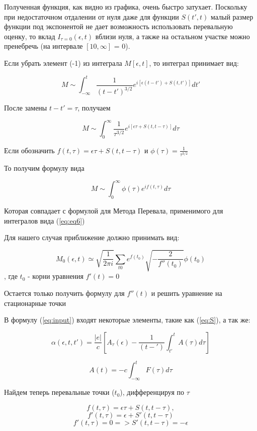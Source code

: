 \documentclass[14pt]{extarticle}
\begin{document}
Полученная функция, как видно из графика, очень быстро затухает. Поскольку при недостаточном отдалении от нуля даже для функции $S(t', t)$ малый размер функции под экспонентой не дает возможность использовать перевальную оценку, то вклад $I_{\tau = 0}(\epsilon, t)$ вблизи нуля, а также на остальном участке можно пренебречь (на интервале $[10, \infty]$ = 0).  

Если убрать элемент (-1) из интеграла $M[\epsilon, t]$, то интеграл принимает вид:

$$
M \sim \int_{-\infty}^{t} \frac{1}{(t-t')^{3/2}} e^{i[\epsilon (t - t') + S(t, t')]} dt'
$$

После замены $t - t' = \tau$, получаем 

$$
M \sim \int_{0}^{\infty}\frac{1}{{\tau}^{3/2}}e^{i [\epsilon \tau + S(t, t-\tau)]} d\tau
$$

Если обозначить
$
f(t, \tau) = \epsilon \tau + S(t, t-\tau) 
$ и
$
\phi(\tau) = \frac{1}{{\tau}^{3/2}} 
$

То получим формулу вида

$$
M \sim \int_{0}^{\infty} \phi(\tau) e^{i f(t, \tau)} d\tau
$$

Которая совпадает с формулой для Метода Перевала, применимого для интегралов вида (\ref{eq:eq6})

Для нашего случая приближение должно принимать вид:

$$
M_0(\epsilon, t) \simeq \sqrt{\frac{1}{2\pi i }}\sum_{t0}e^{f(t_0)} \sqrt{-\frac{2}{f''(t_0)}} \phi(t_0)
$$, где $t_0$ - корни уравнения $f'(t) = 0$

Остается только получить формулу для $f''(t)$ и решить уравнение на стационарные точки 

В формулу (\ref{eq:input}) входят некоторые элементы, такие как (\ref{eq:S}), а так же:

\begin{equation}\label{eq:alpha}
	\alpha(\epsilon, t, t') = \frac{|e|}{c} [A_{\tau}(\epsilon) - \frac{1}{(t-')}\int_{t'}^{t}A(\tau) d\tau]
\end{equation}

\begin{equation}
	A(t) = -c\int_{-\infty}^{t} F(\tau) d\tau
\end{equation}

Найдем теперь перевальные точки ($t_0$), дифференцируя по $\tau$

$$
f(t, \tau) = \epsilon \tau + S(t, t-\tau),
$$
$$
f'(t, \tau) = \epsilon + S'(t, t-\tau)
$$
\begin{equation}\label{eq:points}
f'(t, \tau)=0 => S'(t, t-\tau) = -\epsilon
\end{equation}
\end{document}
